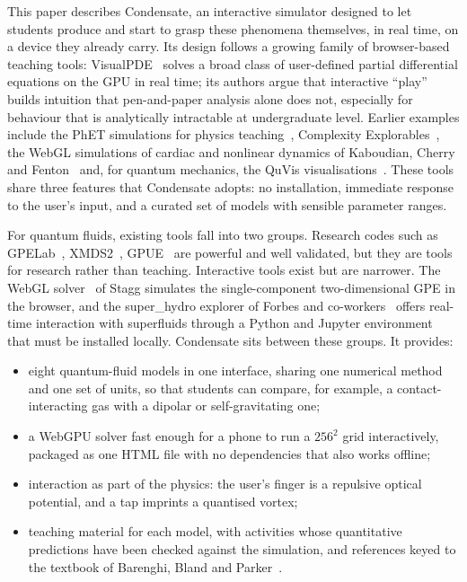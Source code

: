 \documentclass[11pt,a4paper]{article}
\begin{document}
This paper describes Condensate, an interactive simulator designed to let students produce and start to grasp these phenomena themselves, in real time, on a device they already carry. Its design follows a growing family of browser-based teaching tools: VisualPDE~\cite{visualpde} solves a broad class of user-defined partial differential equations on the GPU in real time; its authors argue that interactive ``play'' builds intuition that pen-and-paper analysis alone does not, especially for behaviour that is analytically intractable at undergraduate level. Earlier examples include the PhET simulations for physics teaching~\cite{phet}, Complexity Explorables~\cite{explorables}, the WebGL simulations of cardiac and nonlinear dynamics of Kaboudian, Cherry and Fenton~\cite{kaboudian} and, for quantum mechanics, the QuVis visualisations~\cite{quvis}. These tools share three features that Condensate adopts: no installation, immediate response to the user's input, and a curated set of models with sensible parameter ranges.

For quantum fluids, existing tools fall into two groups. Research codes such as GPELab~\cite{gpelab}, XMDS2~\cite{xmds}, GPUE~\cite{gpue} are powerful and well validated, but they are tools for research rather than teaching. Interactive tools exist but are narrower. The WebGL solver~\cite{stagg} of Stagg simulates the single-component two-dimensional GPE in the browser, and the super\_hydro explorer of Forbes and co-workers~\cite{superhydro} offers real-time interaction with superfluids through a Python and Jupyter environment that must be installed locally. Condensate sits between these groups. It provides:
\begin{itemize}
\item eight quantum-fluid models in one interface, sharing one numerical method and one set of units, so that students can compare, for example, a contact-interacting gas with a dipolar or self-gravitating one;
\item a WebGPU solver fast enough for a phone to run a $256^2$ grid interactively, packaged as one HTML file with no dependencies that also works offline;
\item interaction as part of the physics: the user's finger is a repulsive optical potential, and a tap imprints a quantised vortex;
\item teaching material for each model, with activities whose quantitative predictions have been checked against the simulation, and references keyed to the textbook of Barenghi, Bland and Parker~\cite{bbp}.
\end{itemize}
\end{document}
